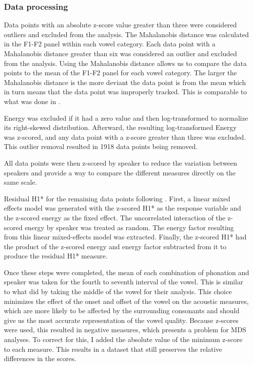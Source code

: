 \subsubsection{Data processing} \label{sec:data_processing}
Data points with an absolute z-score value greater than three were considered outliers and excluded from the analysis. The Mahalanobis distance was calculated in the F1-F2 panel within each vowel category. Each data point with a Mahalanobis distance greater than six was considered an outlier and excluded from the analysis. Using the Mahalanobis distance allows us to compare the data points to the mean of the F1-F2 panel for each vowel category. The larger the Mahalanobis distance is the more deviant the data point is from the mean which in turn means that the data point was improperly tracked. This is comparable to what was done in \citet{seyfarthPlosiveVoicingAcoustics2018,chaiCheckedSyllablesChecked2022,garellekPhoneticsWhiteHmong2023}.

Energy was excluded if it had a zero value and then log-transformed to normalize its right-skewed distribution. Afterward, the resulting log-transformed Energy was z-scored, and any data point with a z-score greater than three was excluded. This outlier removal resulted in 1918 data points being removed. 

All data points were then z-scored by speaker to reduce the variation between speakers and provide a way to compare the different measures directly on the same scale.

Residual H1* for the remaining data points following \citet{chaiH1H2AcousticMeasure2022}. First, a linear mixed effects model was generated with the z-scored H1* as the response variable and the z-scored energy as the fixed effect. The uncorrelated interaction of the z-scored energy by speaker was treated as random. The energy factor resulting from this linear mixed-effects model was extracted. Finally, the z-scored H1* had the product of the z-scored energy and energy factor subtracted from it to produce the residual H1* measure. 

Once these steps were completed, the mean of each combination of phonation and speaker was taken for the fourth to seventh interval of the vowel. This is similar to what \citet{keatingCrosslanguageAcousticSpace2023} did by taking the middle of the vowel for their analysis. This choice minimizes the effect of the onset and offset of the vowel on the acoustic measures, which are more likely to be affected by the surrounding consonants and should give us the most accurate representation of the vowel quality. Because z-scores were used, this resulted in negative measures, which presents a problem for MDS analyses. To correct for this, I added the absolute value of the minimum z-score to each measure. This results in a dataset that still preserves the relative differences in the scores. 
